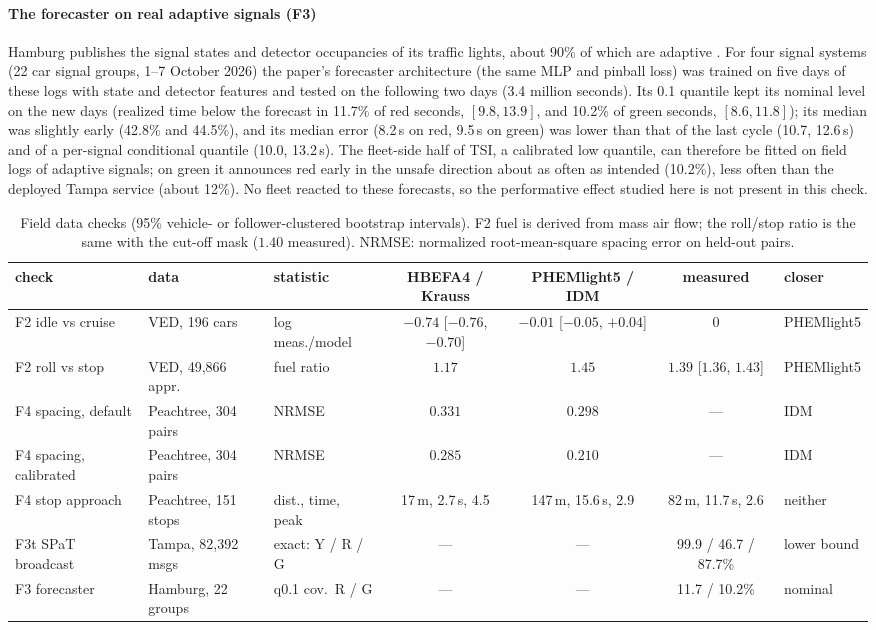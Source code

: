\paragraph{The forecaster on real adaptive signals (F3)} Hamburg publishes the signal states and detector occupancies of its traffic lights,
about 90\% of which are adaptive \cite{jeschor2024}. For four signal systems (22 car signal groups, 1--7 October 2026) the paper's forecaster
architecture (the same MLP and pinball loss) was trained on five days of these logs with state and detector features and tested on the
following two days (3.4 million seconds). Its 0.1 quantile kept its nominal level on the new days (realized time below the forecast in
11.7\% of red seconds, $[9.8, 13.9]$, and 10.2\% of green seconds, $[8.6, 11.8]$); its median was slightly early (42.8\% and 44.5\%), and its
median error (8.2\,s on red, 9.5\,s on green) was lower than that of the last cycle (10.7, 12.6\,s) and of a per-signal conditional quantile
(10.0, 13.2\,s). The fleet-side half of TSI, a calibrated low quantile, can therefore be fitted on field logs of adaptive signals; on green it
announces red early in the unsafe direction about as often as intended (10.2\%), less often than the deployed Tampa service (about 12\%).
No fleet reacted to these forecasts, so the performative effect studied here is not present in this check.
\begin{table}[t]\centering\scriptsize\setlength{\tabcolsep}{3pt}
\caption{Field data checks (95\% vehicle- or follower-clustered bootstrap intervals). F2 fuel is derived from mass air flow; the roll/stop
ratio is the same with the cut-off mask ($1.40$ measured). NRMSE: normalized root-mean-square spacing error on held-out pairs.}\label{tab:field}
\begin{tabular}{@{}lllcccl@{}}\toprule
check & data & statistic & HBEFA4 / Krauss & PHEMlight5 / IDM & measured & closer\\\midrule
F2 idle vs cruise & VED, 196 cars & log meas./model & $-0.74$ [$-0.76$, $-0.70$] & $-0.01$ [$-0.05$, $+0.04$] & 0 & PHEMlight5\\
F2 roll vs stop & VED, 49,866 appr. & fuel ratio & $1.17$ & $1.45$ & $1.39$ [$1.36$, $1.43$] & PHEMlight5\\
F4 spacing, default & Peachtree, 304 pairs & NRMSE & $0.331$ & $0.298$ & --- & IDM\\
F4 spacing, calibrated & Peachtree, 304 pairs & NRMSE & $0.285$ & $0.210$ & --- & IDM\\
F4 stop approach & Peachtree, 151 stops & dist., time, peak & 17\,m, 2.7\,s, 4.5 & 147\,m, 15.6\,s, 2.9 & 82\,m, 11.7\,s, 2.6 & neither\\
F3t SPaT broadcast & Tampa, 82,392 msgs & exact: Y / R / G & --- & --- & 99.9 / 46.7 / 87.7\% & lower bound\\
F3 forecaster & Hamburg, 22 groups & q0.1 cov.\ R / G & --- & --- & 11.7 / 10.2\% & nominal\\\bottomrule
\end{tabular}\end{table}

